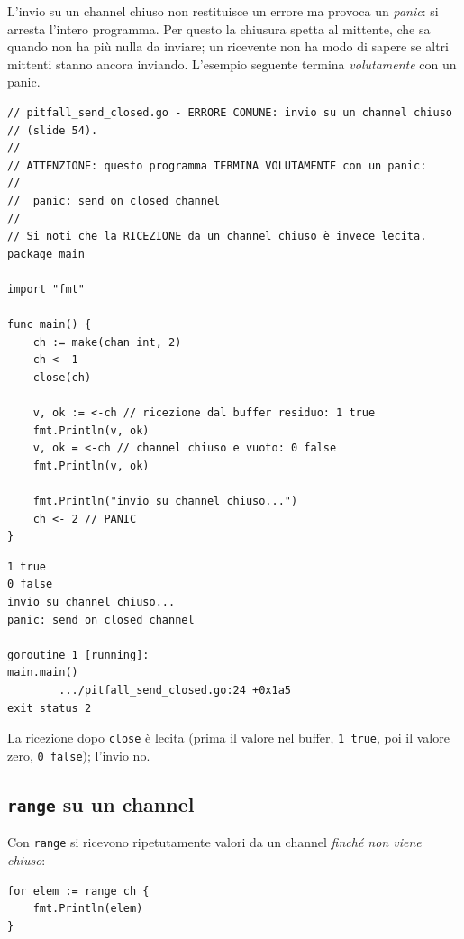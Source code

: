 \documentclass[11pt,a4paper]{report}
\newcommand{\cod}[1]{\texttt{#1}}
\begin{document}
\begin{attenzione}
L'invio su un channel chiuso non restituisce un errore ma provoca un
\emph{panic}: si arresta l'intero programma. Per questo la chiusura spetta al
mittente, che sa quando non ha più nulla da inviare; un ricevente non ha modo
di sapere se altri mittenti stanno ancora inviando. L'esempio seguente termina
\emph{volutamente} con un panic.

\begin{lstlisting}[style=gocode,caption={\texttt{06\_concurrency/pitfall\_send\_closed.go}}]
// pitfall_send_closed.go - ERRORE COMUNE: invio su un channel chiuso
// (slide 54).
//
// ATTENZIONE: questo programma TERMINA VOLUTAMENTE con un panic:
//
//	panic: send on closed channel
//
// Si noti che la RICEZIONE da un channel chiuso è invece lecita.
package main

import "fmt"

func main() {
	ch := make(chan int, 2)
	ch <- 1
	close(ch)

	v, ok := <-ch // ricezione dal buffer residuo: 1 true
	fmt.Println(v, ok)
	v, ok = <-ch // channel chiuso e vuoto: 0 false
	fmt.Println(v, ok)

	fmt.Println("invio su channel chiuso...")
	ch <- 2 // PANIC
}
\end{lstlisting}
\begin{lstlisting}[style=output]
1 true
0 false
invio su channel chiuso...
panic: send on closed channel

goroutine 1 [running]:
main.main()
        .../pitfall_send_closed.go:24 +0x1a5
exit status 2
\end{lstlisting}
La ricezione dopo \cod{close} è lecita (prima il valore nel buffer, \cod{1 true},
poi il valore zero, \cod{0 false}); l'invio no.
\end{attenzione}

\subsection{\texttt{range} su un channel}\label{sec:chanrange}

Con \cod{range} si ricevono ripetutamente valori da un channel \emph{finché
non viene chiuso}:

\begin{lstlisting}[style=gocode,numbers=none]
for elem := range ch {
	fmt.Println(elem)
}
\end{lstlisting}
\end{document}
